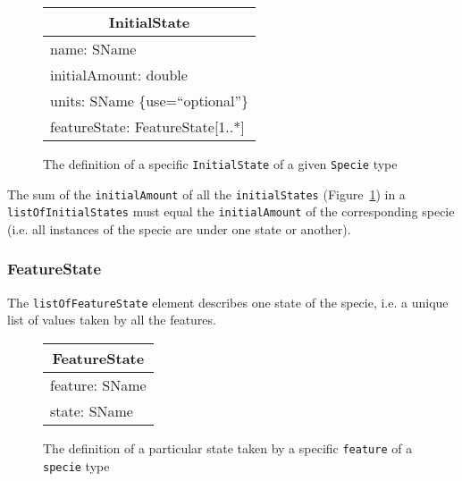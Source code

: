 \documentclass{cekarticle}
\begin{document}
\begin{figure}[h]
  \vspace*{8pt}
  \centering
  \textcolor{red}{%
  \begin{tabular}{|l|}
    \hline
    \multicolumn{1}{|c|}{\rule[-3mm]{0mm}{8mm}{\textsf{InitialState}}}\\
    \hline
    \rule[0mm]{0mm}{5mm}{\textsf{\small name: SName }}\\
    \textsf{\small initialAmount: double }\\
    \textsf{\small units: SName \{use=``optional''\}  }\\
    \rule[-3mm]{0mm}{5mm}{\textsf{\small featureState: FeatureState[1..*] }}\\
    \hline
  \end{tabular}
}
  \caption{The definition of a specific \texttt{InitialState} of a given \texttt{Specie} type}
  \label{fig:initialstate}
\end{figure}

The sum of the \texttt{initialAmount} of all the \texttt{initialStates}
(Figure~\ref{fig:initialstate}) in a \texttt{listOfInitialStates} must equal the
\texttt{initialAmount} of the corresponding specie (i.e. all instances of the
specie are under one state or another).

\subsubsection{FeatureState}\label{sec:featurestate}

The \texttt{listOfFeatureState} element describes one state of the specie, i.e.
a unique list of values taken by all the features.

\begin{figure}[h]
  \vspace*{8pt}
  \centering
  \textcolor{red}{%
  \begin{tabular}{|l|}
    \hline
    \multicolumn{1}{|c|}{\rule[-3mm]{0mm}{8mm}{\textsf{FeatureState}}}\\
    \hline
    \rule[0mm]{0mm}{5mm}{\textsf{\small feature: SName }}\\
    \rule[-3mm]{0mm}{5mm}{\textsf{\small state: SName }}\\
    \hline
  \end{tabular}
}
  \caption{The definition of a particular state taken by a specific \texttt{feature}
    of a \texttt{specie} type}
  \label{fig:featurestate}
\end{figure}
\end{document}
